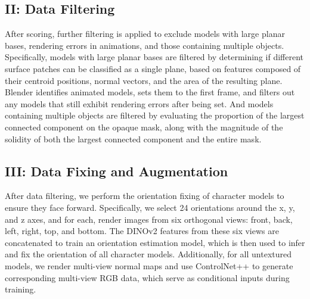 \subsection{II: Data Filtering}
After scoring, further filtering is applied to exclude models with large planar bases, rendering errors in animations, and those containing multiple objects.
Specifically, models with large planar bases are filtered by determining if different surface patches can be classified as a single plane, based on features composed of their centroid positions, normal vectors, and the area of the resulting plane. Blender identifies animated models, sets them to the first frame, and filters out any models that still exhibit rendering errors after being set. And models containing multiple objects are filtered by evaluating the proportion of the largest connected component on the opaque mask, along with the magnitude of the solidity of both the largest connected component and the entire mask.

\subsection{III: Data Fixing and Augmentation}
After data filtering, we perform the orientation fixing of character models to ensure they face forward. Specifically, we select 24 orientations around the x, y, and z axes, and for each, render images from six orthogonal views: front, back, left, right, top, and bottom. The DINOv2\cite{oquab2023dinov2} features from these six views are concatenated to train an orientation estimation model, which is then used to infer and fix the orientation of all character models. Additionally, for all untextured models, we render multi-view normal maps and use ControlNet++\cite{li2024controlnet++} to generate corresponding multi-view RGB data, which serve as conditional inputs during training.

